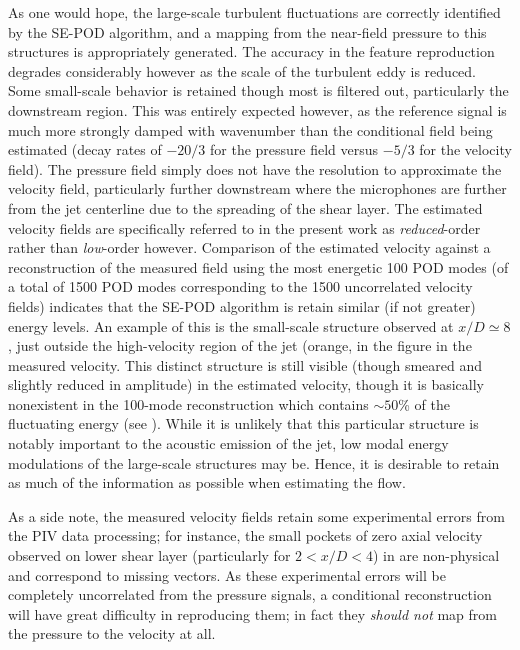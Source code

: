 As one would hope, the large-scale turbulent fluctuations are correctly identified by the SE-POD algorithm, and a mapping from the near-field pressure to this structures is appropriately generated.
The accuracy in the feature reproduction degrades considerably however as the scale of the turbulent eddy is reduced.
Some small-scale behavior is retained though most is filtered out, particularly the downstream region.
This was entirely expected however, as the reference signal is much more strongly damped with wavenumber than the conditional field being estimated (decay rates of $-20/3$ for the pressure field versus $-5/3$ for the velocity field).
The pressure field simply does not have the resolution to approximate the velocity field, particularly further downstream where the microphones are further from the jet centerline due to the spreading of the shear layer.
The estimated velocity fields are specifically referred to in the present work as \textit{reduced}-order rather than \textit{low}-order however.
Comparison of the estimated velocity against a reconstruction of the measured field using the most energetic 100 POD modes (of a total of 1500 POD modes corresponding to the 1500 uncorrelated velocity fields) indicates that the SE-POD algorithm is retain similar (if not greater) energy levels.
An example of this is the small-scale structure observed at $x/D \simeq 8$, just outside the high-velocity region of the jet (orange, in the figure in the measured velocity.
This distinct structure is still visible (though smeared and slightly reduced in amplitude) in the estimated velocity, though it is basically nonexistent in the 100-mode reconstruction which contains $\sim 50$\% of the fluctuating energy (see ).
While it is unlikely that this particular structure is notably important to the acoustic emission of the jet, low modal energy modulations of the large-scale structures may be.
Hence, it is desirable to retain as much of the information as possible when estimating the flow.

As a side note, the measured velocity fields retain some experimental errors from the PIV data processing; for instance, the small pockets of zero axial velocity observed on lower shear layer (particularly for $2 < x/D < 4$) in  are non-physical and correspond to missing vectors. 
As these experimental errors will be completely uncorrelated from the pressure signals, a conditional reconstruction will have great difficulty in reproducing them; in fact they \textit{should not} map from the pressure to the velocity at all.


